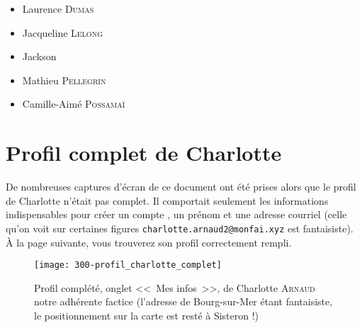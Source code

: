 \begin{itemize}
    \item Laurence \textsc{Dumas}
    \item Jacqueline \textsc{Lelong}
    \item Jackson 
    \item Mathieu \textsc{Pellegrin}
    \item Camille-Aimé \textsc{Possamaï}
\end{itemize}

\section{Profil complet de Charlotte}

De nombreuses captures d'écran de ce document ont été prises alors que le profil de Charlotte n'était pas complet. Il comportait seulement les informations indispensables pour créer un compte \CF, un prénom et une adresse courriel (celle qu'on voit sur certaines figures \texttt{charlotte.arnaud2@monfai.xyz} est fantaisiste). À la page suivante, vous trouverez son profil correctement rempli.

\begin{figure}
    \texttt{[image: 300-profil\_charlotte\_complet]}
    \caption[Profil complet de Charlotte \textsc{Arnaud}]{Profil complété, onglet <<~Mes infos~>>, de Charlotte \textsc{Arnaud} notre adhérente factice  (l'adresse de Bourg-sur-Mer étant fantaisiste, le positionnement sur la carte est resté à Sisteron !)}
    \label{fig:profil_charlotte_complet}
\end{figure}


